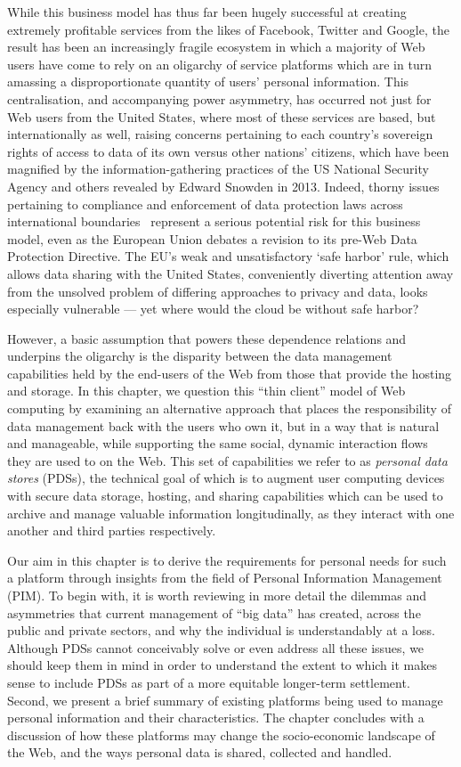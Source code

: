 \documentclass[graybox]{svmult}
\begin{document}
While this business model has thus far been hugely successful at creating extremely profitable services from the likes of Facebook, Twitter and Google, the result has been an increasingly fragile ecosystem in which a majority of Web users have come to rely on an oligarchy of service platforms which are in turn amassing a disproportionate quantity of users' personal information.  This centralisation, and accompanying power asymmetry, has occurred not just for Web users from the United States, where most of these services are based, but internationally as well, raising concerns pertaining to each country's sovereign rights of access to data of its own versus other nations' citizens, which have been magnified by the information-gathering practices of the US National Security Agency and others revealed by Edward Snowden in 2013. Indeed, thorny issues pertaining to compliance and enforcement of data protection laws across international boundaries~\cite{banisar1999global, bygrave2002data} represent a serious potential risk for this business model, even as the European Union debates a revision to its pre-Web Data Protection Directive. The EU’s weak and unsatisfactory `safe harbor' rule, which allows data sharing with the United States, conveniently diverting attention away from the unsolved problem of differing approaches to privacy and data, looks especially vulnerable --- yet where would the cloud be without safe harbor?

However, a basic assumption that powers these dependence relations and underpins the oligarchy is the disparity between the data management capabilities held by the end-users of the Web from those that provide the hosting and storage. In this chapter, we question this ``thin client'' model of Web computing by examining an alternative approach that places the responsibility of data management back with the users who own it, but in a way that is natural and manageable, while supporting the same social, dynamic interaction flows they are used to on the Web.  This set of capabilities we refer to as \emph{personal data stores} (PDSs), the technical goal of which is to augment user computing devices with secure data storage, hosting, and sharing capabilities which can be used to archive and manage valuable information longitudinally, as they interact with one another and third parties respectively.  

Our aim in this chapter is to derive the requirements for personal needs for such a platform through insights from the field of Personal Information Management (PIM). To begin with, it is worth reviewing in more detail the dilemmas and asymmetries that current management of ``big data'' has created, across the public and private sectors, and why the individual is understandably at a loss. Although PDSs cannot conceivably solve or even address all these issues, we should keep them in mind in order to understand the extent to which it makes sense to include PDSs as part of a more equitable longer-term settlement.  Second, we present a brief summary of existing platforms being used to manage personal information and their characteristics.  The chapter concludes with a discussion of how these platforms may change the socio-economic landscape of the Web, and the ways personal data is shared, collected and handled.
\end{document}
